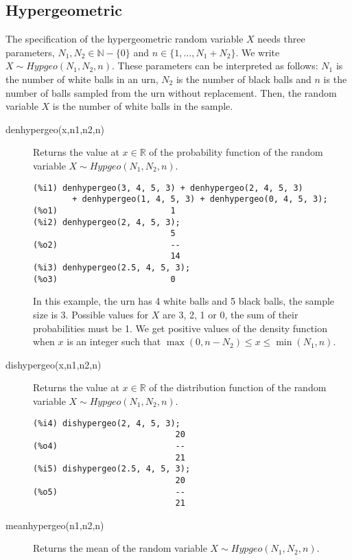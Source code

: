 \documentclass[12pt,a4paper]{article}
\newcommand{\N}{\mathbb{N}}
\newcommand{\R}{\mathbb{R}}
\begin{document}
\subsection{Hypergeometric}

The specification of the hypergeometric random variable $X$ needs three parameters,  $N_1, N_2 \in \N-\{0\}$ and $n \in \{1, \ldots, N_1+N_2\}$. We write $X \sim Hypgeo(N_1, N_2, n)$. These parameters can be interpreted as follows: $N_1$ is the number of white balls in an urn, $N_2$ is the number of black balls and $n$ is the number of balls sampled from the urn without replacement. Then, the random variable $X$ is the number of white balls in the sample.

\begin{description}

\item[denhypergeo(x,n1,n2,n)] Returns the value at $x \in \R$ of the probability function of the random variable $X \sim Hypgeo(N_1, N_2, n)$.

\begin{verbatim}
(%i1) denhypergeo(3, 4, 5, 3) + denhypergeo(2, 4, 5, 3)
        + denhypergeo(1, 4, 5, 3) + denhypergeo(0, 4, 5, 3);
(%o1)                       1
(%i2) denhypergeo(2, 4, 5, 3);
                            5
(%o2)                       --
                            14
(%i3) denhypergeo(2.5, 4, 5, 3);
(%o3)                       0
\end{verbatim}
In this example, the urn has 4 white balls and 5 black balls, the sample size is 3. Possible values for $X$ are 3, 2, 1 or 0, the sum of their probabilities must be 1. We get positive values of the density function when $x$ is an integer such that $\max(0, n-N_2) \leq x \leq \min(N_1,n)$.

\item[dishypergeo(x,n1,n2,n)] Returns the value at $x \in \R$ of the distribution function of the random variable $X \sim Hypgeo(N_1, N_2, n)$.

\begin{verbatim}
(%i4) dishypergeo(2, 4, 5, 3);
                             20
(%o4)                        --
                             21
(%i5) dishypergeo(2.5, 4, 5, 3);
                             20
(%o5)                        --
                             21
\end{verbatim}

\item[meanhypergeo(n1,n2,n)] Returns the mean of the random variable  $X \sim Hypgeo(N_1, N_2, n)$.


\end{description}
\end{document}

